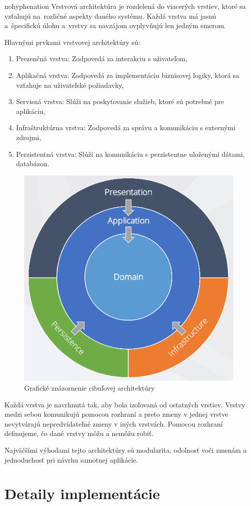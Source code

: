 \begin{hyphenrules}{nohyphenation}
Vrstvová architektúra je rozdelená do viacerých vrstiev, ktoré sa vzťahujú na~rozličné aspekty daného systému. Každá vrstva má jasnú a~špecifickú úlohu a~vrstvy sa navzájom ovplyvňujú len jedným smerom.

Hlavnými prvkami vrstvovej architektúry sú:
\begin{enumerate}
    \item Prezenčná vrstva: Zodpovedá za interakciu s uživateľom,
    \item Aplikačná vrstva: Zodpovedá za implementáciu biznisovej logiky, ktorá sa vzťahuje na uživateľské požiadavky,
    \item Servisná vrstva: Slúži na poskytovanie služieb, ktoré sú potrebné pre aplikáciu,
    \item Infraštruktúrna vrstva: Zodpovedá za správu a komunikáciu s externými zdrojmi,
    \item Perzistentná vrstva: Slúži na komunikáciu s perzistentne uloženými dátami, databázou.
\end{enumerate}


\begin{figure}[H]
    \centering
    \includegraphics[width=0.4\linewidth]{img/onion.png}
    \caption{Grafické znázornenie cibuľovej architektúry\cite{danielrusnok}}
    \label{fig:6.1}
\end{figure}
Každá vrstva je navrhnutá tak, aby bola izolovaná od ostatných vrstiev. Vrstvy medzi sebou komunikujú pomocou rozhraní a preto zmeny v jednej vrstve nevytvárajú nepredvídateľné zmeny v iných vrstvách. Pomocou rozhraní definujeme, čo dané vrstvy môžu a nemôžu robiť.
\newline

Najväčšími výhodami tejto architektúry sú modularita, odolnosť voči zmenám a jednoduchosť pri návrhu samotnej aplikácie.

\section{Detaily implementácie}


\end{hyphenrules}
